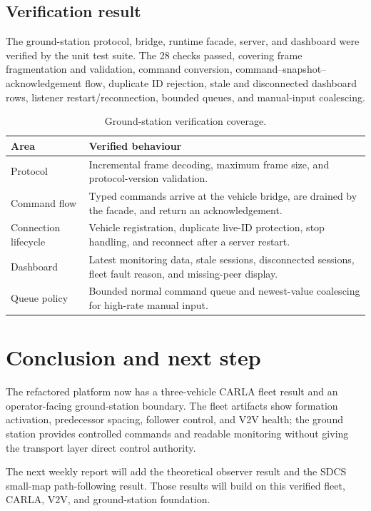 \documentclass[11pt,a4paper]{article}
\begin{document}
\subsection{Verification result}
The ground-station protocol, bridge, runtime facade, server, and dashboard were verified by the unit test suite. The 28 checks passed, covering frame fragmentation and validation, command conversion, command--snapshot--acknowledgement flow, duplicate ID rejection, stale and disconnected dashboard rows, listener restart/reconnection, bounded queues, and manual-input coalescing.

\begin{table}[H]
\centering\scriptsize
\setlength{\tabcolsep}{2pt}
\begin{tabular}{@{}p{2.0cm}p{5.3cm}@{}}
\toprule
\textbf{Area} & \textbf{Verified behaviour}\\
\midrule
Protocol & Incremental frame decoding, maximum frame size, and protocol-version validation.\\
Command flow & Typed commands arrive at the vehicle bridge, are drained by the facade, and return an acknowledgement.\\
Connection lifecycle & Vehicle registration, duplicate live-ID protection, stop handling, and reconnect after a server restart.\\
Dashboard & Latest monitoring data, stale sessions, disconnected sessions, fleet fault reason, and missing-peer display.\\
Queue policy & Bounded normal command queue and newest-value coalescing for high-rate manual input.\\
\bottomrule
\end{tabular}
\caption{Ground-station verification coverage.}
\label{tab:ground-station-results}
\end{table}

\section{Conclusion and next step}
The refactored platform now has a three-vehicle CARLA fleet result and an operator-facing ground-station boundary. The fleet artifacts show formation activation, predecessor spacing, follower control, and V2V health; the ground station provides controlled commands and readable monitoring without giving the transport layer direct control authority.

The next weekly report will add the theoretical observer result and the SDCS small-map path-following result. Those results will build on this verified fleet, CARLA, V2V, and ground-station foundation.
\end{document}
